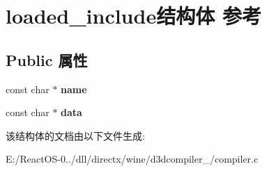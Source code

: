 \hypertarget{structloaded__include}{}\section{loaded\+\_\+include结构体 参考}
\label{structloaded__include}
\subsection*{Public 属性}
\begin{DoxyCompactItemize}
\item 
\mbox{\label{structloaded__include_a9cd418bbb6b84c7dd96c12a6a9f1068f}} 
const char $\ast$ {\bfseries name}
\item 
\mbox{\label{structloaded__include_a823090cf91ce10d80970fda505ac83dd}} 
const char $\ast$ {\bfseries data}
\end{DoxyCompactItemize}


该结构体的文档由以下文件生成\+:\begin{DoxyCompactItemize}
\item 
E\+:/\+React\+O\+S-\/0../dll/directx/wine/d3dcompiler\+\_/compiler.\+c\end{DoxyCompactItemize}

